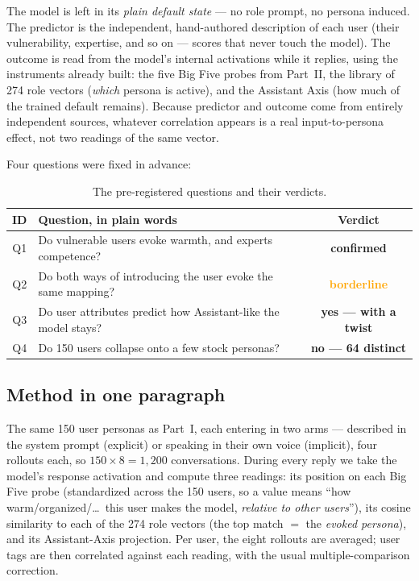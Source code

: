 \documentclass[11pt]{article}
\begin{document}
The model is left in its \emph{plain default
state} --- no role prompt, no persona induced. The predictor is the
independent, hand-authored description of each user (their vulnerability,
expertise, and so on --- scores that never touch the model). The outcome is
read from the model's internal activations while it replies, using the
instruments already built: the five Big Five probes from Part~II, the library
of 274 role vectors (\emph{which} persona is active), and the Assistant Axis
(how much of the trained default remains). Because predictor and outcome come
from entirely independent sources, whatever correlation appears is a real
input-to-persona effect, not two readings of the same vector.

Four questions were fixed in advance:

\begin{table}[h]
\centering\small
\caption{The pre-registered questions and their verdicts.}
\label{tab:upm-q}
\begin{tabular}{clc}
\toprule
ID & Question, in plain words & Verdict \\
\midrule
Q1 & Do vulnerable users evoke warmth, and experts competence? & \textcolor{green!50!black}{\textbf{confirmed}} \\
Q2 & Do both ways of introducing the user evoke the same mapping? & \textcolor{orange}{\textbf{borderline}} \\
Q3 & Do user attributes predict how Assistant-like the model stays? & \textcolor{green!50!black}{\textbf{yes --- with a twist}} \\
Q4 & Do 150 users collapse onto a few stock personas? & \textcolor{red!70!black}{\textbf{no --- 64 distinct}} \\
\bottomrule
\end{tabular}
\end{table}

\subsection{Method in one paragraph}

The same 150 user personas as Part~I, each entering in two arms --- described
in the system prompt (explicit) or speaking in their own voice (implicit),
four rollouts each, so $150 \times 8 = 1{,}200$ conversations. During every
reply we take the model's response activation and compute three readings:
its position on each Big Five probe (standardized across the 150 users, so a
value means ``how warm/organized/\ldots\ this user makes the model,
\emph{relative to other users}''), its cosine similarity to each of the 274
role vectors (the top match $=$ the \emph{evoked persona}), and its
Assistant-Axis projection. Per user, the eight rollouts are averaged; user
tags are then correlated against each reading, with the usual
multiple-comparison correction.
\end{document}
